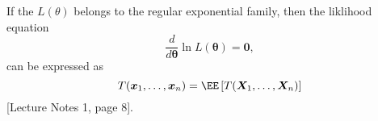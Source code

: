 \begin{thm} \label{thm: ll_rc}
    If the $L (\theta)$ belongs to the regular exponential family, then the liklihood equation
    \begin{equation*}
        \frac{d}{d \bm{\theta}} \ln L (\bm{\theta}) = \bm{0},
    \end{equation*}
    can be expressed as
    \begin{equation*}
        T (\bm{x}_1 , \ldots , \bm{x}_n) = \EE \left[ T (\bm{X}_1 , \ldots , \bm{X}_n) \right]
    \end{equation*}
    [Lecture Notes 1, page 8].
\end{thm}